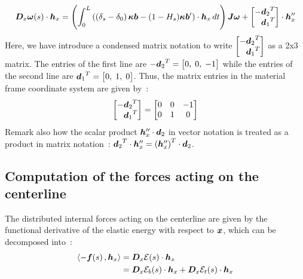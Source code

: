 \begin{equation}
			\pdiffof{x}{\vect{\omega}}{s}{\vect{h}_x}
	= 	\left(\int_0^L \left(\left(\delta_s-\delta_0\right)\vect{\kappa b} - (1-H_s)\vect{\kappa b}'\right)\cdot  \vect{h}_x \,dt\right)\mat{J}\vect{\omega}+
		\begin{bmatrix*}[r]
			-{\vect{d}_2}^T\\
			{\vect{d}_1}^T\\
		\end{bmatrix*}\cdot \vect{h}_x''
\label{eq:dwdx}
\end{equation}
Here, we have introduce a condensed matrix notation to write $\begin{bmatrix*}[r] -{\vect{d}_2}^T\\ {\vect{d}_1}^T\\ \end{bmatrix*}$ as a 2x3 matrix. The entries of the first line are $-{\boldsymbol{d}_2}^T = \begin{bmatrix} 0,\;0,\;-1 \end{bmatrix}$ while the entries of the second line are ${\boldsymbol{d}_1}^T = \begin{bmatrix} 0,\;1,\;0 \end{bmatrix}$. Thus, the matrix entries in the material frame coordinate system are given by~:
\begin{equation}
	\begin{bmatrix*}[r] -{\vect{d}_2}^T\\ {\vect{d}_1}^T \end{bmatrix*}
	=
	\begin{bmatrix} 0 & 0 & -1 \\ 0 & 1 & 0 \end{bmatrix}
\end{equation}
Remark also how the scalar product $\boldsymbol{h}_x''\cdot\boldsymbol{d}_2$ in vector notation is treated as a product in matrix notation~: ${\boldsymbol{d}_2}^T \cdot \boldsymbol{h}_x'' =  {(\boldsymbol{h}_x'')}^T \cdot {\boldsymbol{d}_2}$.

\subsection{Computation of the forces acting on the centerline}
The distributed internal forces acting on the centerline are given by the functional derivative of the elastic energy with respect to $\boldsymbol{x}$, which can be decomposed into~:
\begin{equation}
	\begin{aligned}
	\langle -\boldsymbol{f}(s)\,, \boldsymbol{h}_x\rangle
	&= \boldsymbol{D}_x\mathcal{E}(s)\cdot\boldsymbol{h}_x \\
	&= \boldsymbol{D}_x\mathcal{E}_b(s)\cdot\boldsymbol{h}_x + \boldsymbol{D}_x\mathcal{E}_t(s)\cdot\boldsymbol{h}_x \\
	\end{aligned}
\label{eq:dEdx_def}
\end{equation}

